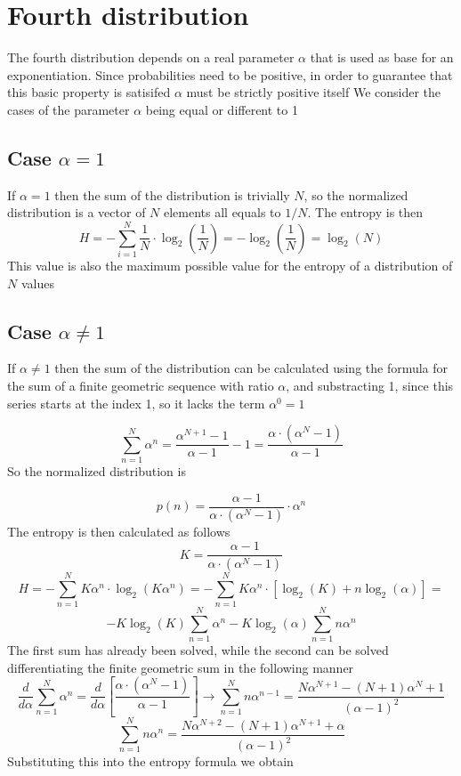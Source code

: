 \section{Fourth distribution}

The fourth distribution depends on a real parameter $\alpha$ that is used as base for an exponentiation.
Since probabilities need to be positive, in order to guarantee that this basic property is satisifed $\alpha$ must be strictly positive itself \newline
We consider the cases of the parameter $\alpha$ being equal or different to 1

\subsection{Case $\alpha = 1$}

If $\alpha = 1$ then the sum of the distribution is trivially $N$, so the normalized distribution is a vector of $N$ elements all equals to $1/N$. The entropy is then 
\[ 
	H = - \sum_{i=1}^{N} \frac{1}{N} \cdot \log_2\left(\frac{1}{N}\right)
	= - \log_2 \left(\frac{1}{N}\right) = \log_2(N)
\]
This value is also the maximum possible value for the entropy of a distribution of $N$ values

\subsection{Case $\alpha \ne 1$}

If $\alpha \ne 1$ then the sum of the distribution can be calculated using the formula for the sum of a finite geometric sequence with ratio $\alpha$, and substracting 1, since this series starts at the index 1, so it lacks the term $\alpha^0 = 1$

\[ 
	\sum_{n=1}^{N} \alpha^n = 
	\frac{\alpha^{N+1} - 1}{\alpha - 1} - 1 =
	\frac{\alpha \cdot (\alpha^N - 1)}{\alpha - 1}
\]
So the normalized distribution is

\[ 
	p(n) = \frac{\alpha - 1}{\alpha \cdot (\alpha^N - 1)} \cdot \alpha^n
\]
The entropy is then calculated as follows
\[ 
	K = \frac{\alpha - 1}{\alpha \cdot (\alpha^N - 1)}
\]
\[ 
	H =
	- \sum_{n=1}^{N} K \alpha^n \cdot \log_2
	\left(
		K \alpha^n
	\right) =
	- \sum_{n=1}^{N} K \alpha^n \cdot
	\left[
	\log_2(K) + n\log_2(\alpha)
	\right] =
\]
\[ 
	- K \log_2(K) \sum_{n=1}^{N} \alpha^n
	- K \log_2(\alpha)
	\sum_{n=1}^{N} n\alpha^n
\]
The first sum has already been solved, while the second can be solved differentiating the finite geometric sum in the following manner
\[
	\frac{d}{d\alpha} \sum_{n=1}^{N} \alpha^n =
	\frac{d}{d\alpha} 
	\left[
		\frac{\alpha \cdot (\alpha^N - 1)}{\alpha - 1}
	\right]
	\rightarrow
	\sum_{n=1}^{N} n \alpha^{n-1} =
	\frac{N\alpha^{N+1} - (N+1)\alpha^N + 1}
	{(\alpha - 1)^2}
\]
\[ 
	\sum_{n=1}^{N} n \alpha^n =
	\frac{N\alpha^{N+2} - (N+1)\alpha^{N+1} + \alpha}
	{(\alpha - 1)^2}
\]
Substituting this into the entropy formula we obtain

